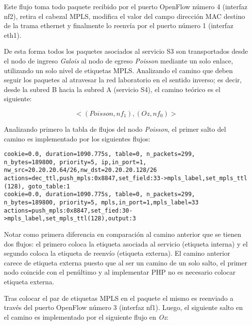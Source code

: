 Este flujo toma todo paquete recibido por el puerto OpenFlow n\'umero 4 (interfaz nf2), retira el cabezal MPLS, modifica el valor del campo direcci\'on MAC destino de la trama ethernet y finalmente lo reenvía por el puerto n\'umero 1 (interfaz eth1). 

De esta forma todos los paquetes asociados al servicio S3 son transportados desde el nodo de ingreso \textit{Galois} al nodo de egreso \textit{Poisson} mediante un solo enlace, utilizando un solo nivel de etiquetas MPLS. Analizando el camino que deben seguir los paquetes al atravesar la red laboratorio en el sentido inverso; es decir, desde la subred B hacia la subred A (servicio S4), el camino teórico es el siguiente:

$$<(Poisson, nf_1), (Oz, nf_0)>$$ 

Analizando primero la tabla de flujos del nodo \textit{Poisson}, el primer salto del camino es implementado por los siguientes flujos:

\begin{center}
\texttt{cookie=0.0, duration=1090.775s, table=0, n\_packets=299, \\
n\_bytes=189800, priority=5, ip,in\_port=1,\\ 
nw\_src=20.20.20.64/26,nw\_dst=20.20.20.128/26 \\
actions=dec\_ttl,push\_mpls:0x8847,set\_field:33->mpls\_label,set\_mpls\_ttl (128), goto\_table:1 \\
\vspace{0.5cm}
cookie=0.0, duration=1090.775s, table=0, n\_packets=299, \\
n\_bytes=189800, priority=5, mpls,in\_port=1,mpls\_label=33 \\
actions=push\_mpls:0x8847,set\_fied:30->mpls\_label,set\_mpls\_ttl(128),output:3
}
\end{center}

Notar como primera diferencia en comparación al camino anterior que se tienen dos flujos: el primero coloca la etiqueta asociada al servicio (etiqueta interna) y el segundo coloca la etiqueta de reenvío (etiqueta externa). El camino anterior carece de etiqueta externa puesto que al ser un camino de un solo salto, el primer nodo coincide con el pen\'ultimo y al implementar PHP no es necesario colocar etiqueta externa. 

Tras colocar el par de etiquetas MPLS en el paquete el mismo es reenviado a trav\'es del puerto OpenFlow n\'umero 3 (interfaz nf1). Luego, el siguiente salto en el camino es implementado por el siguiente flujo en \textit{Oz}:

